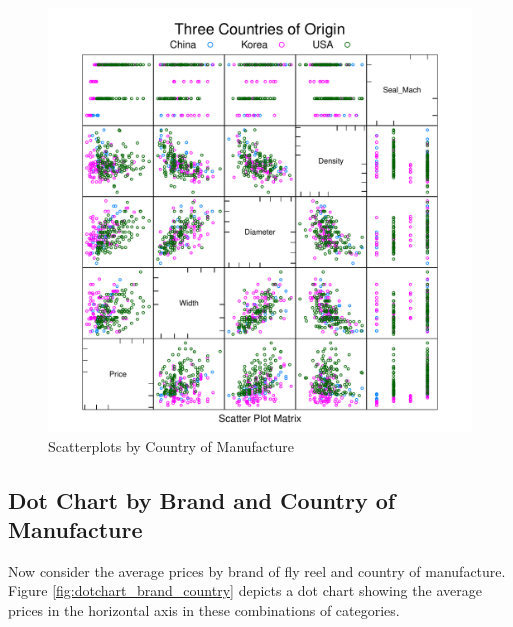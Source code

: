 \documentclass[11pt]{book}
\begin{document}
\begin{figure}[h!]
  \centering
  \includegraphics[scale = 0.5, keepaspectratio=true]{../Figures/slpom_by_country}
  \caption{Scatterplots by Country of Manufacture} \label{fig:slpom_by_country}
\end{figure}



\pagebreak
\subsection*{Dot Chart by Brand and Country of Manufacture}

Now consider the average prices by brand of fly reel and 
country of manufacture. 
Figure \ref{fig:dotchart_brand_country} depicts a dot chart
showing the average prices in the horizontal axis 
in these combinations of categories.
\end{document}
